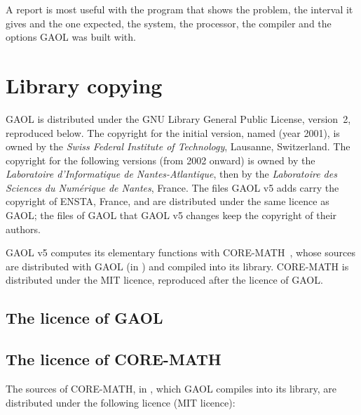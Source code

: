 \documentclass[12pt,a4paper,twoside,openright]{book}
\begin{document}
\noindent
A report is most useful with the program that shows the problem, the
interval it gives and the one expected, the system, the processor, the
compiler and the options GAOL was built with.

\chapter{Library copying}\label{chap:copying}

GAOL is distributed under the GNU Library General Public License,
version~2, reproduced below. The copyright for the initial version, named
 (year 2001), is owned by the \emph{Swiss Federal Institute of
Technology}, Lausanne, Switzerland. The copyright for the following versions
(from 2002 onward) is owned by the \emph{Laboratoire d'Informatique de
Nantes-Atlantique}, then by the \emph{Laboratoire des Sciences du
Num\'erique de Nantes}, France. The files GAOL v5 adds carry the copyright of
ENSTA, France, and are distributed under the same licence as GAOL; the files
of GAOL that GAOL v5 changes keep the copyright of their authors.
%

GAOL v5 computes its elementary functions with CORE-MATH~\cite{CoreMath:2022},
whose sources are distributed with GAOL (in ) and
compiled into its library. CORE-MATH is distributed under the MIT licence,
reproduced after the licence of GAOL.
%

\section{The licence of GAOL}


\section{The licence of CORE-MATH}

The sources of CORE-MATH, in , which GAOL compiles into
its library, are distributed under the following licence (MIT licence):
\end{document}
